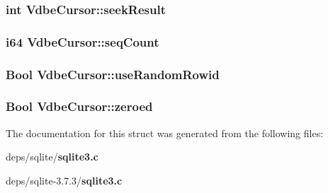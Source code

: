 \subsubsection{\setlength{\rightskip}{0pt plus 5cm}int \bf{Vdbe\-Cursor::seek\-Result}}\label{structVdbeCursor_4c054ba3bed7be887ce3f732c6eb95b2}


\subsubsection{\setlength{\rightskip}{0pt plus 5cm}\bf{i64} \bf{Vdbe\-Cursor::seq\-Count}}\label{structVdbeCursor_167950f9ca157f39b5957c12dfa9359a}


\subsubsection{\setlength{\rightskip}{0pt plus 5cm}\bf{Bool} \bf{Vdbe\-Cursor::use\-Random\-Rowid}}\label{structVdbeCursor_8fa67681514723290d079c928ec4630a}


\subsubsection{\setlength{\rightskip}{0pt plus 5cm}\bf{Bool} \bf{Vdbe\-Cursor::zeroed}}\label{structVdbeCursor_a31a0fe480462c810744b84a73c1effa}




The documentation for this struct was generated from the following files:\begin{CompactItemize}
\item 
deps/sqlite/\bf{sqlite3.c}\item 
deps/sqlite-3.7.3/\bf{sqlite3.c}\end{CompactItemize}
